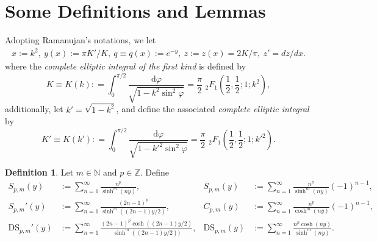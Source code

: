 \documentclass[11pt]{article}
\let\oldsection\section
\renewcommand\section{\setcounter{equation}{0}\oldsection}
\theoremstyle{plain}
\theoremstyle{definition}
\newtheorem{defn}{Definition}[section]
\begin{document}
\section{Some Definitions and Lemmas}
Adopting Ramanujan's notations, we let
\begin{align}\label{notations-Ramanujan}
	x:=k^2,\ y\left( x \right):=\pi K'/K,\ q\equiv q\left( x \right):=e^{-y},\ z:=z\left( x \right) =2K/\pi,\ z'=dz/dx.
\end{align}
where the \emph{complete elliptic integral of the first kind} is defined by
$$
K\equiv K(k): =\int_0^{\pi /2}{\frac{\mathrm{d}\varphi}{\sqrt{1-k^2\sin ^2\varphi}}=\frac{\pi}{2}}\,\,_2F_1\left(
\frac{1}{2},\frac{1}{2};1;k^2 \right) ,
$$
additionally, let $k'=\sqrt{1-k^2}$, and define the associated \emph{complete elliptic integral} by $$
K'\equiv K(k'): =\int_0^{\pi /2}{\frac{\mathrm{d}\varphi}{\sqrt{1-k'^2\sin ^2\varphi}}=\frac{\pi}{2}}\,\,_2F_1\left( \frac{1}{2},\frac{1}{2};1;k'^2 \right) .
$$
\begin{defn} 
	Let $m\in\mathbb{N}$ and $p\in\mathbb{Z}$. Define
	\begin{align*}
		S_{p,m}(y)&:=\sum_{n = 1}^{\infty}\frac{n^p}{\sinh^m(ny)},&\overline{S}_{p,m}(y)&:=\sum_{n = 1}^{\infty}\frac{n^p}{\sinh^m(ny)}(-1)^{n - 1},\\
		S_{p,m}'(y)&:=\sum_{n = 1}^{\infty}\frac{(2n - 1)^p}{\sinh^m((2n - 1)y/2)},&\overline{C}_{p,m}(y)&:=\sum_{n = 1}^{\infty}\frac{n^p}{\cosh^m(ny)}(-1)^{n - 1},\\
		\mathrm{DS}_{p,m}'(y)&:=\sum_{n=1}^{\infty}{\frac{(2n-1)^p\cosh((2n-1)y/2)}{\sinh ^m((2n-1)y/2))}},&\mathrm{DS}_{p,m}(y) &:=\sum_{n=1}^{\infty}{\frac{n^p\cosh \left( ny \right)}{\sinh ^m(ny)}}.
	\end{align*}
\end{defn}
\end{document}
